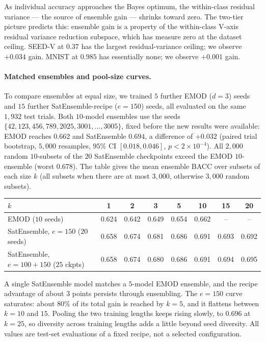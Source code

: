 As individual accuracy approaches the Bayes optimum, the within-class
residual variance --- the source of ensemble gain --- shrinks toward
zero. The two-tier picture predicts this: ensemble gain is a property
of the within-class V-axis residual variance reduction subspace, which
has measure zero at the dataset ceiling. SEED-V at $0.37$ has the
largest residual-variance ceiling; we observe $+0.034$ gain. MNIST at
$0.985$ has essentially none; we observe $+0.001$ gain.

\begin{revblock}
\paragraph{Matched ensembles and pool-size curves.}\label{app:pool-curves}
To compare ensembles at equal size, we trained $5$ further EMOD ($d{=}3$)
seeds and $15$ further SatEnsemble-recipe ($e{=}150$) seeds, all evaluated
on the same $1{,}932$ test trials. Both $10$-model ensembles use the seeds
$\{42,123,456,789,2025,3001,\dots,3005\}$, fixed before the new results
were available: EMOD reaches $0.662$ and SatEnsemble $0.694$, a
difference of $+0.032$ (paired trial bootstrap, $5{,}000$ resamples, $95\%$ CI
$[0.018, 0.046]$, $p{<}2{\times}10^{-4}$). All $2{,}000$ random $10$-subsets of
the $20$ SatEnsemble checkpoints exceed the EMOD $10$-ensemble (worst
$0.678$). The table gives the mean ensemble BACC over subsets of
each size $k$ (all subsets when there are at most $3{,}000$, otherwise
$3{,}000$ random subsets).

\begin{center}
\small
\begin{tabular}{lccccccc}
\toprule
$k$ & 1 & 2 & 3 & 5 & 10 & 15 & 20 \\
\midrule
EMOD ($10$ seeds) & 0.624 & 0.642 & 0.649 & 0.654 & 0.662 & -- & -- \\
SatEnsemble, $e{=}150$ ($20$ seeds) & 0.658 & 0.674 & 0.681 & 0.686 & 0.691 & 0.693 & 0.692 \\
SatEnsemble, $e{=}100{+}150$ ($25$ ckpts) & 0.658 & 0.674 & 0.680 & 0.686 & 0.691 & 0.694 & 0.695 \\
\bottomrule
\end{tabular}
\end{center}
A single SatEnsemble model matches a $5$-model EMOD ensemble, and the
recipe advantage of about $3$ points persists through ensembling. The
$e{=}150$ curve saturates: about $80\%$ of its total gain is reached by
$k{=}5$, and it flattens between $k{=}10$ and $15$. Pooling the two training
lengths keeps rising slowly, to $0.696$ at $k{=}25$, so diversity across
training lengths adds a little beyond seed diversity. All values are
test-set evaluations of a fixed recipe, not a selected configuration.
\end{revblock}

